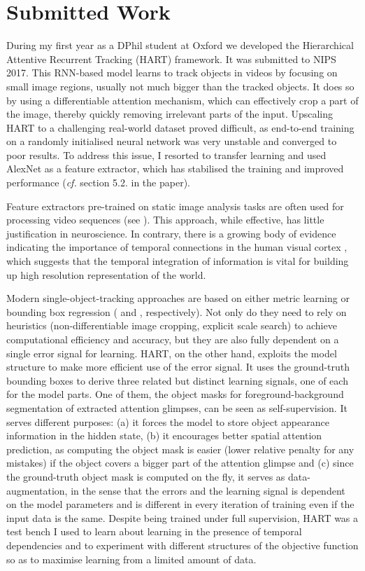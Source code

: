 \section{Submitted Work}
\label{sec:done}

    During my first year as a DPhil student at Oxford we developed the Hierarchical Attentive Recurrent Tracking (HART) framework. It was submitted to NIPS 2017. This RNN-based model learns to track objects in videos by focusing on small image regions, usually not much bigger than the tracked objects. It does so by using a differentiable attention mechanism, which can effectively crop a part of the image, thereby quickly removing irrelevant parts of the input.
    Upscaling HART to a challenging real-world dataset proved difficult, as end-to-end training on a randomly initialised neural network was very unstable and converged to poor results. To address this issue, I resorted to transfer learning and used AlexNet \citep{Krizhevsky2012} as a feature extractor, which has stabilised the training and improved performance (\emph{cf.} section 5.2. in the paper).
    
    Feature extractors pre-trained on static image analysis tasks are often used for processing video sequences (see \eg \cite{Ning2016a}). This approach, while effective, has little justification in neuroscience. In contrary, there is a growing body of evidence indicating the importance of temporal connections in the human visual cortex \citep{Ungerleider2000}, which suggests that the temporal integration of information is vital for building up high resolution representation of the world.   
    
    Modern single-object-tracking approaches are based on either metric learning or bounding box regression (\cite{Bertinetto2016} and \cite{Held2016}, respectively). Not only do they need to rely on heuristics (non-differentiable image cropping, explicit scale search) to achieve computational efficiency and accuracy, but they are also fully dependent on a single error signal for learning.
    HART, on the other hand, exploits the model structure to make more efficient use of the error signal. It uses the ground-truth bounding boxes to derive three related but distinct learning signals, one of each for the model parts. One of them, the object masks for foreground-background segmentation of extracted attention glimpses, can be seen as self-supervision.
    It serves different purposes: (a) it forces the model to store object appearance information in the hidden state, (b) it encourages better spatial attention prediction, as computing the object mask is easier (lower relative penalty for any mistakes) if the object covers a bigger part of the attention glimpse and (c) since the ground-truth object mask is computed on the fly, it serves as data-augmentation, in the sense that the errors and the learning signal is dependent on the model parameters and is different in every iteration of training even if the input data is the same.
    Despite being trained under full supervision, HART was a test bench I used to learn about learning in the presence of temporal dependencies and to experiment  with different structures of the objective function so as to maximise learning from a limited amount of data.
    
    
   